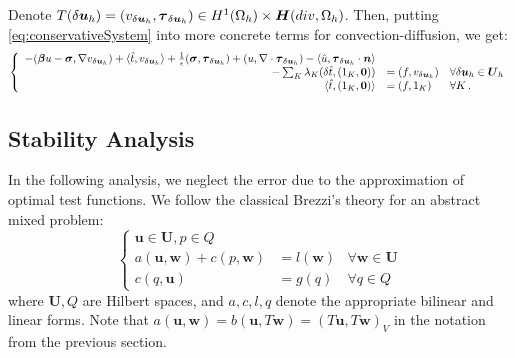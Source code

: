 \documentclass[letterpaper]{article}
\def\btau{\boldsymbol\tau}
\def\bfsigma{\boldsymbol\sigma}
\def\bbeta{\boldsymbol\beta}
\newcommand{\bs}[1]{\boldsymbol{#1}}
\newcommand{\LRp}[1]{\left( #1 \right)}
\newcommand{\bfu}{\boldsymbol u}
\newcommand{\bfU}{\boldsymbol U}
\newcommand{\bfw}{\boldsymbol w}
\newcommand{\bfH}{\mbox{\boldmath $H$}}
\newcommand{\vdeltau}{v_{\delta\bs u_h}}
\newcommand{\taudeltau}{\btau_{\delta\bs u_h}}
\begin{document}
Denote $T(\delta\bfu_h)=\LRp{\vdeltau,\taudeltau}\in
H^1(\Omega_h)\times\bfH(div,\Omega_h)$.
Then, putting \eqref{eq:conservativeSystem} into more concrete terms for
convection-diffusion, we get:
\begin{equation}
\left\{
\begin{array}[c]{rll}
-(\bbeta u-\bfsigma,\nabla \vdeltau)+\langle\hat t,\vdeltau\rangle
+ \frac{1}{\epsilon}(\bfsigma,\taudeltau)
+(u,\nabla\cdot\taudeltau)
-\langle\hat u,\taudeltau\cdot\bs n\rangle\\
-\sum_K\lambda_K (\delta\hat t,(1_K,\bs0))
&=(f,\vdeltau) & \forall\delta\bs u_h\in\bs U_h\\
\langle\hat t,(1_K,\bs0)\rangle &=(f,1_K) & \forall K\,.
\end{array}
\right.
\label{eq:conservativeConfusionSystem}
\end{equation}

\subsection{Stability Analysis}

In the following analysis, we neglect the error due to the approximation of optimal test functions.
We follow the classical Brezzi's theory \cite{Brezzi1974,DBB05} for an abstract
mixed problem:
\begin{equation}
\left\{
\begin{array}{lll}
\bfu \in \bfU, p \in Q\\
a(\bfu,\bfw) + c(p,\bfw) & = l(\bfw) & \forall \bfw \in \bfU \\
c(q,\bfu) & = g(q) & \forall q \in Q
\end{array}
\right.
\end{equation}
where $\bfU,Q$ are Hilbert spaces, and $a,c,l,q$ denote the appropriate
bilinear and linear forms. Note that $a(\bfu,\bfw)=b(\bfu,T\bfw)=(T\bfu,T\bfw)_V$ in
the notation from the previous section.
\end{document}
